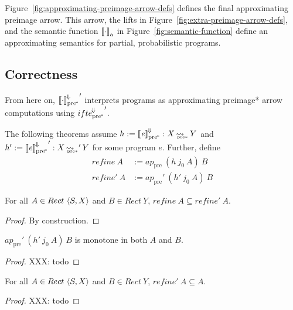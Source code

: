 \documentclass[preprint]{sigplanconf}
\newcommand{\arrow}{\rightsquigarrow}
\newcommand{\conv}{^{\mspace{-2mu}\Downarrow\mspace{-2mu}}}
\newcommand{\arrowconvif}{\ensuremath{ifte\conv}}
\newcommand{\gen}{_\mathrm{a}}
\newcommand{\pre}{_\mathrm{pre}}
\newcommand{\ppre}{_\mathrm{pre^{\mspace{-2mu}*}}}
\DeclareMathOperator{\ppreto}{\arrow_{\mspace{-19mu}_{\mathrm{pre*}}}}
\newcommand{\convifppre}{\arrowconvif\ppre}
\begin{document}
Figure~\ref{fig:approximating-preimage-arrow-defs} defines the final approximating preimage arrow.
This arrow, the lifts in Figure~\ref{fig:extra-preimage-arrow-defs}, and the semantic function $\meaningof{\cdot}\gen$ in Figure~\ref{fig:semantic-function} define an approximating semantics for partial, probabilistic programs.

\subsection{Correctness}

From here on, ${\meaningof{\cdot}\conv\ppre}'$ interprets programs as approximating preimage* arrow computations using ${\convifppre}'$.

The following theorems assume $h := \meaningof{\mathit{e}}\conv\ppre : X \ppreto Y$ and $h' := {\meaningof{\mathit{e}}\conv\ppre}' : X \ppreto' Y$ for some program $\mathit{e}$.
Further, define
\begin{equation}
\begin{aligned}
	refine~A &:= ap\pre~(h~j_0~A)~B \\
	refine'~A &:= ap\pre'~(h'~j_0~A)~B
\end{aligned}
\end{equation}

\begin{theorem}[approximation]
For all $A \in Rect~\langle{S,X}\rangle$ and $B \in Rect~Y$, $refine~A \subseteq refine'~A$.
\end{theorem}
\begin{proof}By construction.\end{proof}

\begin{theorem}[monotonicity]
$ap\pre'~(h'~j_0~A)~B$ is monotone in both $A$ and $B$.
\end{theorem}
\begin{proof}
XXX: todo
\end{proof}

\begin{theorem}
For all $A \in Rect~\langle{S,X}\rangle$ and $B \in Rect~Y$, $refine'~A \subseteq A$.
\end{theorem}
\begin{proof}
XXX: todo
\end{proof}
\end{document}
